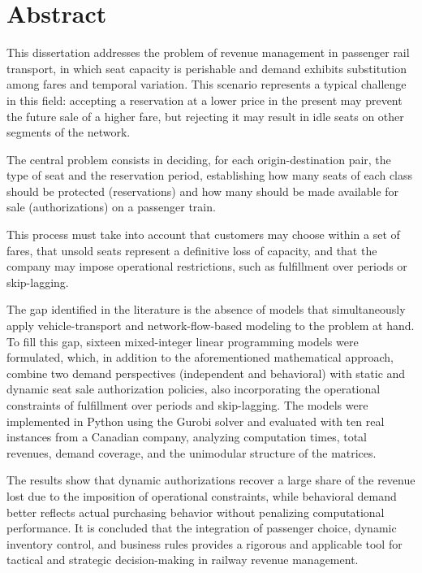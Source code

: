 \chapter*{Abstract}

\vspace{-1.0cm}

    This dissertation addresses the problem of revenue management in passenger rail transport, in which seat capacity is perishable and demand exhibits substitution among fares and temporal variation. This scenario represents a typical challenge in this field: accepting a reservation at a lower price in the present may prevent the future sale of a higher fare, but rejecting it may result in idle seats on other segments of the network.

    The central problem consists in deciding, for each origin-destination pair, the type of seat and the reservation period, establishing how many seats of each class should be protected (reservations) and how many should be made available for sale (authorizations) on a passenger train.

    This process must take into account that customers may choose within a set of fares, that unsold seats represent a definitive loss of capacity, and that the company may impose operational restrictions, such as fulfillment over periods or skip-lagging.

    The gap identified in the literature is the absence of models that simultaneously apply vehicle-transport and network-flow-based modeling to the problem at hand. To fill this gap, sixteen mixed-integer linear programming models were formulated, which, in addition to the aforementioned mathematical approach, combine two demand perspectives (independent and behavioral) with static and dynamic seat sale authorization policies, also incorporating the operational constraints of fulfillment over periods and skip-lagging. The models were implemented in Python using the Gurobi solver and evaluated with ten real instances from a Canadian company, analyzing computation times, total revenues, demand coverage, and the unimodular structure of the matrices.

    The results show that dynamic authorizations recover a large share of the revenue lost due to the imposition of operational constraints, while behavioral demand better reflects actual purchasing behavior without penalizing computational performance. It is concluded that the integration of passenger choice, dynamic inventory control, and business rules provides a rigorous and applicable tool for tactical and strategic decision-making in railway revenue management.



